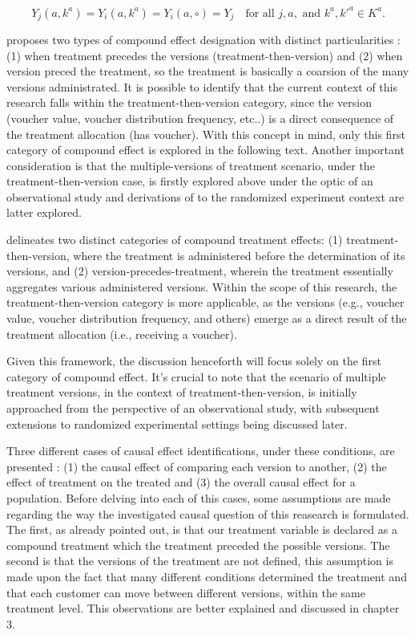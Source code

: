 \begin{equation}
  Y_{j}(a, k^{a}) = Y_{i}(a, k^{a}) = Y_{i}(a, \circ) = Y_j \quad \text{for all } j, a, \text{ and } k^{a}, k'^{a} \in K^{a}.
  \label{eq:treatment_variation_irrelevance}
\end{equation}

\textcite{vanderweeleCausalInferenceMultiple2013} proposes two types of compound effect designation with distinct particularities : (1) when treatment precedes the versions (treatment-then-version) and (2) when version preced the treatment, so the treatment is basically a coarsion of the many versions administrated.
It is possible to identify that the current context of this research falls within the treatment-then-version category, since the version (voucher value, voucher distribution frequency, etc..) is a direct consequence of the treatment allocation (has voucher).
With this concept in mind, only this first category of compound effect is explored in the following text. Another important consideration is that the multiple-versions of treatment scenario, under the treatment-then-version case, is firstly explored above under the optic of an observational study and derivations of to the 
randomized experiment context are latter explored. 

\textcite{vanderweeleCausalInferenceMultiple2013} delineates two distinct categories of compound treatment effects: (1) treatment-then-version, where the treatment is administered before the determination of its versions, and (2) version-precedes-treatment, wherein the treatment essentially aggregates various administered versions. 
Within the scope of this research, the treatment-then-version category is more applicable, as the versions (e.g., voucher value, voucher distribution frequency, and others) emerge as a direct result of the treatment allocation (i.e., receiving a voucher).

Given this framework, the discussion henceforth will focus solely on the first category of compound effect. It's crucial to note that the scenario of multiple treatment versions, in the context of treatment-then-version,
is initially approached from the perspective of an observational study, with subsequent extensions to randomized experimental settings being discussed later.

Three different cases of causal effect identifications, under these conditions, are presented : (1) the causal effect of comparing each version to another, (2) the effect of treatment on the treated and (3) the overall causal effect for a population. Before delving into each of this cases, some assumptions are made regarding the way the investigated
causal question of this reasearch is formulated. The first, as already pointed out, is that our treatment variable is declared as a compound treatment which the treatment preceded the possible versions. The second is that the versions of the treatment are not defined, this assumption is made upon the fact that many different conditions determined the treatment
and that each customer can move between different versions, within the same treatment level. This observations are better explained and discussed in chapter 3. 

